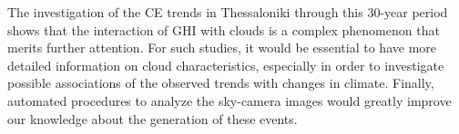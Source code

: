 \documentclass[preprint, 5p,
authoryear]{elsarticle} %
\begin{document}
The investigation of the CE trends in Thessaloniki through this 30-year
period shows that the interaction of GHI with clouds is a complex
phenomenon that merits further attention. For such studies, it would be
essential to have more detailed information on cloud characteristics,
especially in order to investigate possible associations of the observed
trends with changes in climate. Finally, automated procedures to analyze
the sky-camera images would greatly improve our knowledge about the
generation of these events.


\end{document}
